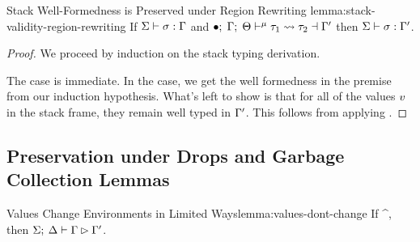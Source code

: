 \begin{oxlemma}{Stack Well-Formedness is Preserved under Region Rewriting}
  {lemma:stack-validity-region-rewriting} If
  $\Sigma \vdash \sigma : \Gamma$ and
  $\bullet; \; \Gamma; \; \Theta \vdash^{\mu} \tau_1 \leadsto \tau_2 \dashv \Gamma^\prime$
  then $\Sigma \vdash \sigma : \Gamma^\prime$.
\end{oxlemma}

\begin{proof}
  We proceed by induction on the stack typing derivation.
  
  \vspace{1em}
  \noindent \framebox[\textwidth]{ \figuresize
    \begin{mathpar}
      \VStack \and \VStackEmpty
    \end{mathpar}
  } \vspace{1em}

  The  case is immediate. In the 
  case, we get the well formedness in the premise from our induction hypothesis.
  What's left to show is that for all of the values $v$ in the stack
  frame, they remain well typed in $\Gamma^\prime$. This follows from
  applying .
\end{proof}

\subsection{Preservation under Drops and Garbage Collection Lemmas}
\label{sec:environment-relation-lemmas}

\begin{oxlemma}{Values Change Environments in Limited Ways}{lemma:values-dont-change}
  If \oxtypjudge{\oxglobalctx}{\oxtvarctx}{\oxkontctx}{\oxvarctx}{\oxvalue}
  {\oxtype}{\oxvarctx^\prime}, then
  $\Sigma; \: \Delta \vdash \Gamma \rhd \Gamma^\prime$.
\end{oxlemma}

